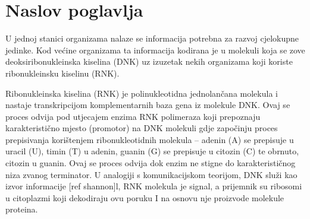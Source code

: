 \section{Naslov poglavlja}
\label{ch:ch1}


U jednoj stanici organizama nalaze se informacija potrebna za razvoj cjelokupne jedinke. Kod većine organizama ta informacija kodirana je u molekuli koja se zove deoksiribonukleinska kiselina  (DNK) uz izuzetak nekih organizama koji koriste ribonukleinsku kiselinu (RNK). 

Ribonukleinska kiselina (RNK) je polinukleotidna jednolančana molekula i nastaje transkripcijom komplementarnih baza gena iz molekule DNK. Ovaj se proces odvija pod utjecajem enzima RNK polimeraza koji prepoznaju karakteristično mjesto (promotor) na DNK molekuli gdje započinju proces prepisivanja korištenjem ribonukleotidnih molekula – adenin (A) se prepisuje u uracil (U), timin (T) u adenin, guanin (G) se prepisuje u citozin (C) te obrnuto, citozin u guanin. Ovaj se proces odvija dok enzim ne stigne do karakterističnog niza zvanog terminator. U analogiji s komunikacijskom teorijom, DNK služi kao izvor informacije [ref shannon]l, RNK molekula je signal, a prijemnik su ribosomi u citoplazmi koji dekodiraju ovu poruku I na osnovu nje proizvode molekule proteina.

